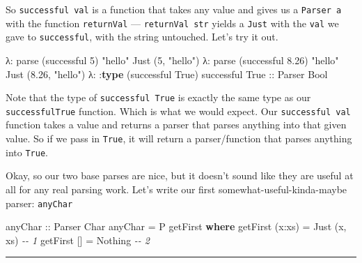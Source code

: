 \documentclass[]{article}
\newenvironment{Shaded}{}{}
\newcommand{\CommentTok}[1]{\textcolor[rgb]{0.38,0.63,0.69}{\textit{#1}}}
\newcommand{\DataTypeTok}[1]{\textcolor[rgb]{0.56,0.13,0.00}{#1}}
\newcommand{\DecValTok}[1]{\textcolor[rgb]{0.25,0.63,0.44}{#1}}
\newcommand{\FloatTok}[1]{\textcolor[rgb]{0.25,0.63,0.44}{#1}}
\newcommand{\KeywordTok}[1]{\textcolor[rgb]{0.00,0.44,0.13}{\textbf{#1}}}
\newcommand{\NormalTok}[1]{#1}
\newcommand{\OperatorTok}[1]{\textcolor[rgb]{0.40,0.40,0.40}{#1}}
\newcommand{\OtherTok}[1]{\textcolor[rgb]{0.00,0.44,0.13}{#1}}
\newcommand{\StringTok}[1]{\textcolor[rgb]{0.25,0.44,0.63}{#1}}
\begin{document}
So \texttt{successful\ val} is a function that takes any value and gives us a
\texttt{Parser\ a} with the function \texttt{returnVal} ---
\texttt{returnVal\ str} yields a \texttt{Just} with the \texttt{val} we gave to
\texttt{successful}, with the string untouched. Let's try it out.

\begin{Shaded}
\begin{Highlighting}[]
\NormalTok{λ}\OperatorTok{:}\NormalTok{ parse (successful }\DecValTok{5}\NormalTok{) }\StringTok{"hello"}
\DataTypeTok{Just}\NormalTok{ (}\DecValTok{5}\NormalTok{, }\StringTok{"hello"}\NormalTok{)}
\NormalTok{λ}\OperatorTok{:}\NormalTok{ parse (successful }\FloatTok{8.26}\NormalTok{) }\StringTok{"hello"}
\DataTypeTok{Just}\NormalTok{ (}\FloatTok{8.26}\NormalTok{, }\StringTok{"hello"}\NormalTok{)}
\NormalTok{λ}\OperatorTok{:} \OperatorTok{:}\KeywordTok{type}\NormalTok{ (successful }\DataTypeTok{True}\NormalTok{)}
\NormalTok{successful }\DataTypeTok{True}\OtherTok{ ::} \DataTypeTok{Parser} \DataTypeTok{Bool}
\end{Highlighting}
\end{Shaded}

Note that the type of \texttt{successful\ True} is exactly the same type as our
\texttt{successfulTrue} function. Which is what we would expect. Our
\texttt{successful\ val} function takes a value and returns a parser that parses
anything into that given value. So if we pass in \texttt{True}, it will return a
parser/function that parses anything into \texttt{True}.

Okay, so our two base parses are nice, but it doesn't sound like they are useful
at all for any real parsing work. Let's write our first
somewhat-useful-kinda-maybe parser: \texttt{anyChar}

\begin{Shaded}
\begin{Highlighting}[]
\OtherTok{anyChar ::} \DataTypeTok{Parser} \DataTypeTok{Char}
\NormalTok{anyChar }\OtherTok{=} \DataTypeTok{P}\NormalTok{ getFirst}
    \KeywordTok{where}
\NormalTok{        getFirst (x}\OperatorTok{:}\NormalTok{xs) }\OtherTok{=} \DataTypeTok{Just}\NormalTok{ (x, xs)          }\CommentTok{{-}{-} 1}
\NormalTok{        getFirst []     }\OtherTok{=} \DataTypeTok{Nothing}               \CommentTok{{-}{-} 2}
\end{Highlighting}
\end{Shaded}

\begin{center}\rule{0.5\linewidth}{0.5pt}\end{center}
\end{document}

